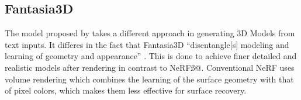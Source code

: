 \subsection{Fantasia3D}\label{fantasia3D}

The model proposed by \citeauthor{chen2023fantasia3d} takes a different approach in generating 3D Models from text inputs. It differes in the fact that Fantasia3D ``disentangle[s] modeling and learning of geometry and appearance'' \citep{chen2023fantasia3d}. This is done to achieve finer detailed and realistic models after rendering in contrast to NeRFß@. Conventional NeRF uses volume rendering which combines the learning of the surface geometry with that of pixel colors, which makes them less effective for surface recovery.